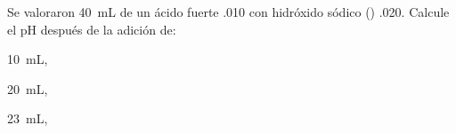 Se valoraron \SI{40}{\milli\liter} de un ácido fuerte  \SI{,010}{\Molar} con hidróxido sódico () \SI{,020}{\Molar}. Calcule el pH después de la adición de:
	\begin{enumerate*}[label={\alph*)},font=\bfseries]
		 \item \SI{10}{\milli\liter},
		 \item \SI{20}{\milli\liter},
		 \item \SI{23}{\milli\liter},
	\end{enumerate*}
